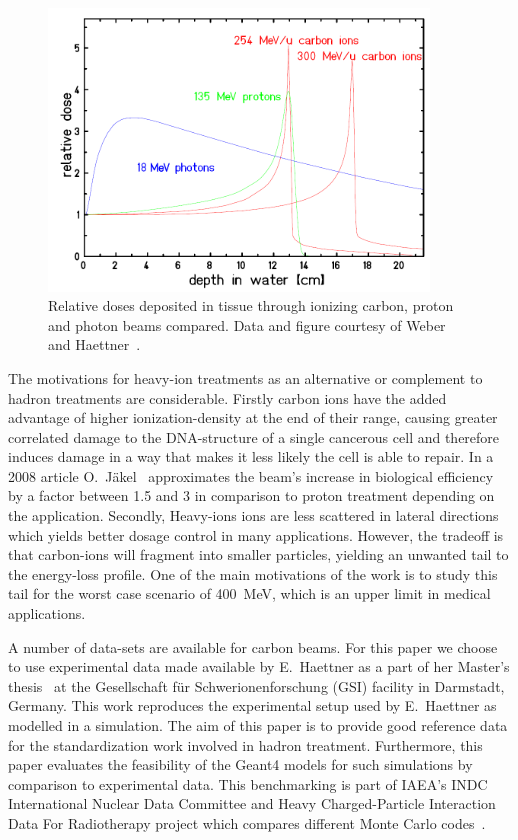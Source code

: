 \begin{figure}[!h]
\begin{center}
\includegraphics[width=0.9\textwidth]{images/DosesFromHaettner.png}  
\caption{\label{fig:DosesFromHaettner} Relative doses deposited in tissue through ionizing carbon, proton and photon beams compared. Data and figure courtesy of Weber~\cite{weber} and Haettner~\cite{ehaettner}.} 
\end{center}
\end{figure} 

The motivations for heavy-ion treatments as an alternative or complement to hadron treatments are considerable. Firstly carbon ions have the added advantage of higher ionization-density at the end of their range, causing greater correlated damage to the DNA-structure of a single cancerous cell and therefore induces damage in a way that makes it less likely the cell is able to repair. In a 2008 article O.~Jäkel~\cite{ojakel} approximates the beam's increase in biological efficiency by a factor between 1.5 and 3 in comparison to proton treatment depending on the application. Secondly, Heavy-ions ions are less scattered in lateral directions which yields better dosage control in many applications. However, the tradeoff is that carbon-ions will fragment into smaller particles, yielding an unwanted tail to the energy-loss profile. One of the main motivations of the work is to study this tail for the worst case scenario of 400~MeV, which is an upper limit in medical applications.

A number of data-sets are available for carbon beams. For this paper we choose to use experimental data made available by E.~Haettner as a part of her Master's thesis~\cite{ehaettner} at the Gesellschaft für Schwerionenforschung (GSI) facility in Darmstadt, Germany. This work reproduces the experimental setup used by E.~Haettner as modelled in a simulation. The aim of this paper is to provide good reference data for the standardization work involved in hadron treatment. Furthermore, this paper evaluates the feasibility of the Geant4 models for such simulations by comparison to experimental data. This benchmarking is part of IAEA's INDC International Nuclear Data Committee and Heavy Charged-Particle Interaction Data For Radiotherapy project which compares different Monte Carlo codes~\cite{SummaryReport}.


